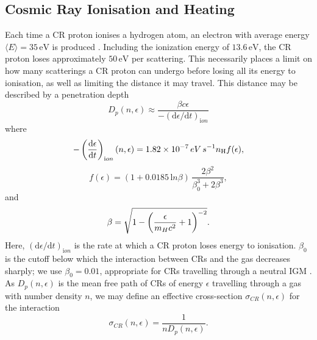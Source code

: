 \documentclass{thesis}
\newcommand{\ev}{\ensuremath{\,\mathrm{eV}}\xspace}
\newcommand{\h}{\ensuremath{\mathrm{H}}\xspace}
\begin{document}
\subsection{Cosmic Ray Ionisation and Heating}
\label{CRchem}

Each time a CR proton ionises a hydrogen atom, an electron with average energy $\langle E \rangle = 35\ev$ is produced \citep{SpitzerTomasko1968}.  
Including the ionization energy of $13.6\ev$, the CR proton loses approximately $50\ev$ per scattering. 
This necessarily places a limit on how many scatterings a CR proton can undergo before losing all its energy to ionisation, as well as limiting the distance it may travel.  
This distance may be described by a penetration depth 
\begin{equation}
    D_p(n, \epsilon) \approx \frac{\beta c \epsilon} {-({\mathrm d}\epsilon / {\mathrm d}t)_{\mathrm ion}}
\end{equation}
where \citep{Schlickeiser2002}
\begin{equation}
    - \left( \frac{{\mathrm d}\epsilon} {{\mathrm d}t} \right)_{\mathrm ion}(n, \epsilon)
    = 1.82\times10^{-7}\,{\mathrm \small eV\,s}^{-1} n_{\h} f(\epsilon),
\end{equation}
\begin{equation}    
    f(\epsilon) = (1 + 0.0185 \,{\mathrm ln}\beta )\, \frac{2 \beta^2}{\beta_0^3 + 2 \beta^3},
\end{equation}
and 
\begin{equation}
    \beta =  \sqrt{1 - \left( \frac{\epsilon}{m_{\mathrm \tiny H}c^2}+1 \right)^{-2}}.
\end{equation}
Here, $({\mathrm d}\epsilon / {\mathrm d}t)_{\mathrm ion}$ is the rate at which a CR proton loses energy to ionisation. 
$\beta_0$ is the cutoff below which the interaction between CRs and the gas decreases sharply; we use $\beta_0=0.01$, appropriate for CRs travelling through a neutral IGM \citep{StacyBromm2007}.
As $D_p(n, \epsilon)$ is the mean free path of CRs of energy $\epsilon$ travelling through a gas with number density $n$, we may define an effective cross-section $\sigma_{CR}(n,\epsilon)$ for the interaction
\begin{equation}
\sigma_{CR}(n,\epsilon) = \frac{1}{n D_p(n, \epsilon)}.
\end{equation}
\end{document}
